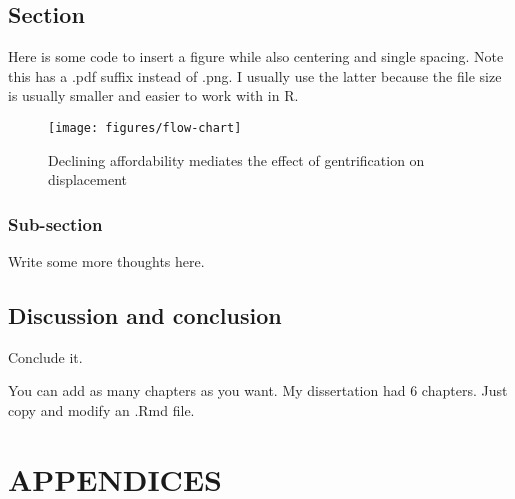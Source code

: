 \documentclass[
]{DissertateCUNY}
\begin{document}
\hypertarget{section-1}{%
\section{Section}\label{section-1}}

Here is some code to insert a figure while also centering and single
spacing. Note this has a .pdf suffix instead of .png. I usually use the
latter because the file size is usually smaller and easier to work with
in R.

\begin{center}
\begin{singlespace}
\begin{figure}

{\centering \texttt{[image: figures/flow-chart]} 

}

\caption{Declining affordability mediates the effect of gentrification on displacement}\label{fig:flowchart}
\end{figure}
\end{singlespace}
\end{center}

\hypertarget{sub-section-1}{%
\subsection{Sub-section}\label{sub-section-1}}

Write some more thoughts here.

\hypertarget{discussion-and-conclusion-2}{%
\section{Discussion and conclusion}\label{discussion-and-conclusion-2}}

Conclude it.

You can add as many chapters as you want. My dissertation had 6
chapters. Just copy and modify an .Rmd file.

\FloatBarrier

\newpage

\fancyhead[R]{\thepage}
\fancyfoot[C]{}
\chapter*{APPENDICES}

\appendix
\renewcommand\thefigure{A.\arabic{figure}}    
\setcounter{figure}{0}
\renewcommand\thetable{A.\arabic{table}} 
\setcounter{table}{0}
\end{document}
